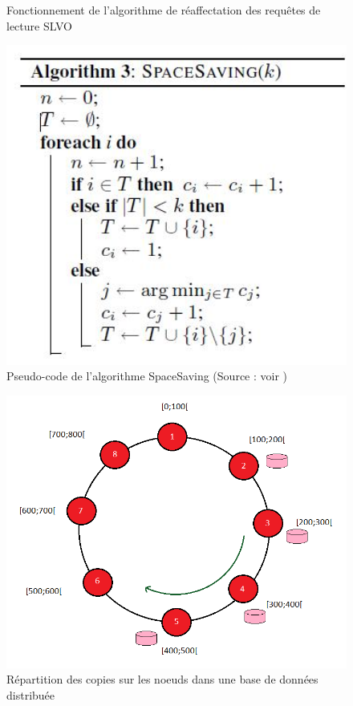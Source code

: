 \documentclass[12pt]{article}
\begin{document}
\begin{figure}[H]
	\centering
		
	\caption{Fonctionnement de l'algorithme de réaffectation des requêtes de lecture SLVO\label{fig:reaffectation}}
\end{figure}

\begin{figure}[H]
	\centering
        \includegraphics[width=12cm]{images/besoins/code_spaceSaving.jpg}
    \caption{Pseudo-code de l'algorithme SpaceSaving (Source : voir \cite{SpaceSaving2}) \label{fig:codeSpaceSaving}}
\end{figure}

\begin{figure}[H]
	\centering
        \includegraphics[width=12cm]{images/besoins/replication.png}
    \caption{Répartition des copies sur les noeuds dans une base de données distribuée \label{fig:replication}}
\end{figure}
\end{document}
